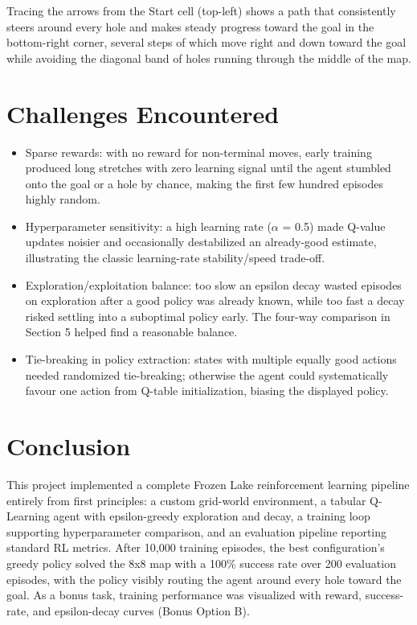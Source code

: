 \documentclass[11pt]{article}
\begin{document}
Tracing the arrows from the Start cell (top-left) shows a path that consistently steers around every hole and makes steady progress toward the goal in the bottom-right corner, several steps of which move right and down toward the goal while avoiding the diagonal band of holes running through the middle of the map.

\section{Challenges Encountered}

\begin{itemize}
\item Sparse rewards: with no reward for non-terminal moves, early training produced long stretches with zero learning signal until the agent stumbled onto the goal or a hole by chance, making the first few hundred episodes highly random.
\item Hyperparameter sensitivity: a high learning rate ($\alpha$ = 0.5) made Q-value updates noisier and occasionally destabilized an already-good estimate, illustrating the classic learning-rate stability/speed trade-off.
\item Exploration/exploitation balance: too slow an epsilon decay wasted episodes on exploration after a good policy was already known, while too fast a decay risked settling into a suboptimal policy early. The four-way comparison in Section 5 helped find a reasonable balance.
\item Tie-breaking in policy extraction: states with multiple equally good actions needed randomized tie-breaking; otherwise the agent could systematically favour one action from Q-table initialization, biasing the displayed policy.
\end{itemize}

\section{Conclusion}

This project implemented a complete Frozen Lake reinforcement learning pipeline entirely from first principles: a custom grid-world environment, a tabular Q-Learning agent with epsilon-greedy exploration and decay, a training loop supporting hyperparameter comparison, and an evaluation pipeline reporting standard RL metrics. After 10,000 training episodes, the best configuration's greedy policy solved the 8x8 map with a 100\% success rate over 200 evaluation episodes, with the policy visibly routing the agent around every hole toward the goal. As a bonus task, training performance was visualized with reward, success-rate, and epsilon-decay curves (Bonus Option B).
\end{document}
